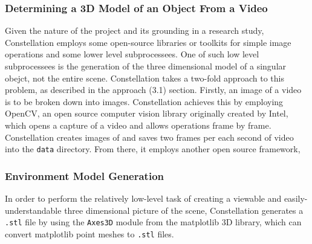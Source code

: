 \subsubsection{Determining a 3D Model of an Object From a Video}
Given the nature of the project and its grounding in a research study, Constellation employs some open-source libraries or toolkits for simple image operations and some lower level subprocessees. One of such low level subprocessees is the generation of the three dimensional model of a singular obejct, not the entire scene. Constellation takes a two-fold approach to this problem, as described in the approach (3.1) section. Firstly, an image of a video is to be broken down into images. Constellation achieves this by employing OpenCV, an open source computer vision library originally created by Intel, which opens a capture of a video and allows operations frame by frame. Constellation creates images of and saves two frames per each second of video into the \texttt{data} directory. From there, it employs another open source framework, 
\subsubsection{Environment Model Generation}
In order to perform the relatively low-level task of creating a viewable and easily-understandable three dimensional picture of the scene, Constellation generates a \texttt{.stl} file by using the \texttt{Axes3D} module from the matplotlib 3D library, which can convert matplotlib point meshes to \texttt{.stl} files.